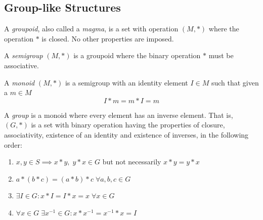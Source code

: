 \documentclass{article}
\begin{document}
\subsection{Group-like Structures}

\begin{definition}
  A \textit{groupoid}, also called a \textit{magma}, is a set with operation $(M, *)$ where the operation $*$ is closed. No other properties are imposed. 
\end{definition}

\begin{definition}
  A \textit{semigroup} $(M, *)$ is a groupoid where the binary operation $*$ must be associative.  
\end{definition}

\begin{definition}
  A \textit{monoid} $(M, *)$ is a semigroup with an identity element $I \in M$ such that given a $m \in M$
  \[I * m = m * I = m \]
\end{definition}

\begin{definition}
  A \textit{group} is a monoid where every element has an inverse element. That is, $(G, *)$ is a set with binary operation having the properties of closure, associativity, existence of an identity and existence of inverses, in the following order: 
  \begin{enumerate}
    \item $x, y \in S \implies x*y, \;y*x \in G$ but not necessarily $x*y  = y*x$
    \item $a*(b*c) = (a*b)*c \; \forall a, b, c \in G$
    \item $\exists I \in G : x*I = I*x = x \; \forall x \in G $
    \item $\forall x \in G \; \exists x^{-1} \in G : x * x^{-1} = x^{-1} * x = I$
  \end{enumerate}
\end{definition}
\end{document}
